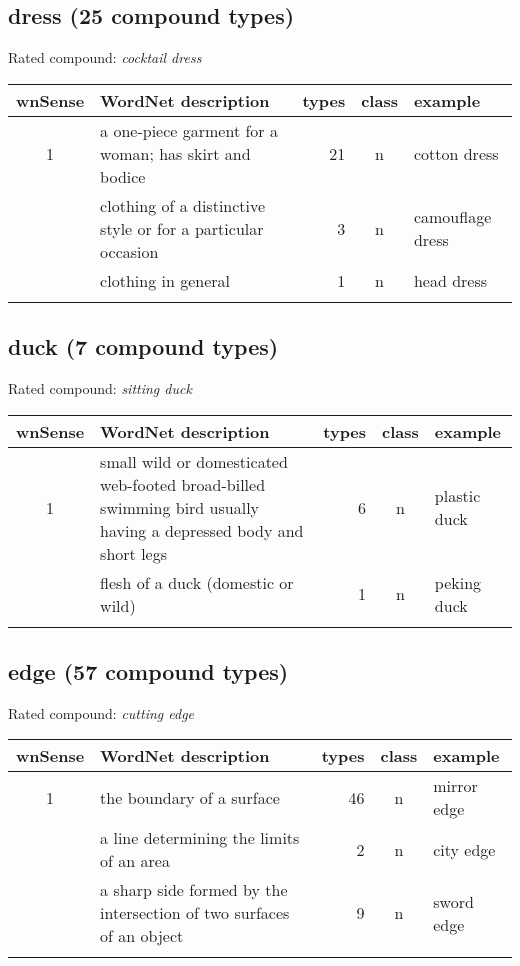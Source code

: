 \subsection{dress     (25 compound types)}
Rated compound: \emph{cocktail dress}
\vspace*{-.3cm}


\noindent
\begin{longtable}{c>{\raggedright\arraybackslash}p{5cm}rc>{\raggedright\arraybackslash}p{2cm}}\lsptoprule
{\small wnSense}&WordNet description&types&class&example\\\midrule
1&a one-piece garment for a woman; has skirt and bodice&21&n&cotton dress\\\tablevspace
2&clothing of a distinctive style or for a particular occasion&3&n&camouflage dress\\\tablevspace
3&clothing in general&1&n&head dress\\\lspbottomrule
\end{longtable}

\pagebreak[4]
\subsection{duck     (7 compound types)}
Rated compound: \emph{sitting duck}

\vspace*{1ex}

\noindent
\begin{longtable}{c>{\raggedright\arraybackslash}p{5cm}rc>{\raggedright\arraybackslash}p{2cm}}\lsptoprule
{\small wnSense}&WordNet description&types&class&example\\\midrule
1&small wild or domesticated web-footed broad-billed swimming bird usually having a depressed body and short legs&6&n&plastic duck\\\tablevspace
3&flesh of a duck (domestic or wild)&1&n&peking duck\\\lspbottomrule
\end{longtable}
\subsection{edge      (57 compound types)}
Rated compound: \emph{cutting edge}

\vspace*{1ex}

\noindent
\begin{longtable}{c>{\raggedright\arraybackslash}p{5cm}rc>{\raggedright\arraybackslash}p{2cm}}\lsptoprule
{\small wnSense}&WordNet description&types&class&example\\\midrule
1&the boundary of a surface&46&n&mirror edge\\\tablevspace
2&a line determining the limits of an area&2&n&city edge\\\tablevspace
3&a sharp side formed by the intersection of two surfaces of an object&9&n&sword edge\\\lspbottomrule
\end{longtable}

